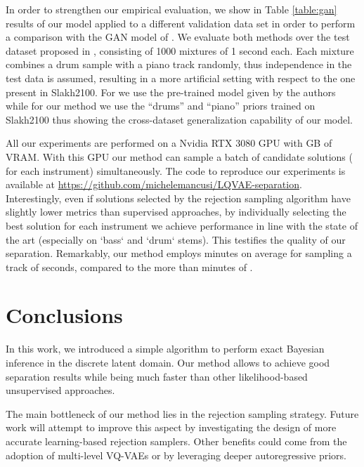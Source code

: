 \documentclass[a4paper]{article}
\begin{document}
In order to strengthen our empirical evaluation, we show in Table \ref{table:gan} results of our model applied to a different validation data set in order to perform a comparison with the GAN model of \cite{narayanaswamy2020unsupervised}. We evaluate both methods over the test dataset
proposed in \cite{narayanaswamy2020unsupervised}, consisting of 1000 mixtures of 1 second each. Each mixture combines a drum sample with a piano track randomly, thus independence
in the test data is assumed, resulting in a more artificial setting with respect
to the one present in Slakh2100. For \cite{narayanaswamy2020unsupervised} we use the pre-trained model
given by the authors while for our method we use the “drums” and “piano” priors trained on Slakh2100 thus showing the cross-dataset generalization
capability of our model.


All our experiments are performed on a Nvidia RTX 3080 GPU with  GB of VRAM. With this GPU our method can sample a batch of  candidate solutions ( for each instrument) simultaneously. The code to reproduce our experiments is available at \url{https://github.com/michelemancusi/LQVAE-separation}.
Interestingly, even if solutions selected by the rejection sampling algorithm have slightly lower metrics than supervised approaches, by individually selecting the best solution for each instrument we achieve performance in line with the state of the art (especially on `bass` and `drum` stems). This testifies the quality of our separation. 
Remarkably, our method employs  minutes on average for sampling a track of  seconds,
compared to the more than  minutes of \cite{jayaram2021}.











 \section{Conclusions}
\label{sec:conclusion}
In this work, we introduced a simple algorithm to perform exact Bayesian inference in the discrete latent domain.
Our method allows to achieve good separation results while being much faster than other likelihood-based unsupervised approaches.


The main bottleneck of our method lies in the rejection sampling strategy. Future work will attempt to improve this aspect by investigating the design of more accurate learning-based rejection samplers. Other benefits could come from the adoption of multi-level VQ-VAEs \cite{dhariwal:2020} or by leveraging deeper autoregressive priors.

%
 



\end{document}
